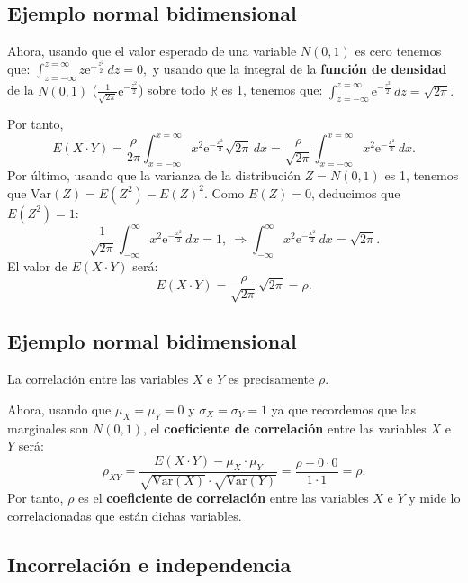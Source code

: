 \documentclass[]{book}
\begin{document}
\hypertarget{ejemplo-normal-bidimensional-1}{%
\subsection{Ejemplo normal bidimensional}\label{ejemplo-normal-bidimensional-1}}

Ahora, usando que el valor esperado de una variable \(N(0,1)\) es cero tenemos que:
\(\int_{z=-\infty}^{z=\infty} z \mathrm{e}^{-\frac{z^2}{2}}\, dz =0,\) y usando que la integral de la \textbf{función de densidad} de la \(N(0,1)\) (\(\frac{1}{\sqrt{2\pi}}\mathrm{e}^{-\frac{z^2}{2}}\)) sobre todo \(\mathbb{R}\) es 1, tenemos que:
\(\int_{z=-\infty}^{z=\infty} \mathrm{e}^{-\frac{z^2}{2}}\, dz =\sqrt{2\pi}.\)

Por tanto,
\[
E(X\cdot Y)=\frac{\rho}{2\pi} \int_{x=-\infty}^{x=\infty} x^2  \mathrm{e}^{-\frac{x^2}{2}}\sqrt{2\pi}\, dx=\frac{\rho}{\sqrt{2\pi}}\int_{x=-\infty}^{x=\infty} x^2  \mathrm{e}^{-\frac{x^2}{2}}\, dx.
\]
Por último, usando que la varianza de la distribución \(Z=N(0,1)\) es 1, tenemos que \(\mathrm{Var}(Z)=E\left(Z^2\right)-E(Z)^2\). Como \(E(Z)=0\), deducimos que \(E\left(Z^2\right)=1\):
\[
\frac{1}{\sqrt{2\pi}}\int_{-\infty}^\infty x^2\mathrm{e}^{-\frac{x^2}{2}}\, dx=1,\ \Rightarrow \int_{-\infty}^\infty x^2\mathrm{e}^{-\frac{x^2}{2}}\, dx=\sqrt{2\pi}.
\]
El valor de \(E(X\cdot Y)\) será:
\[
E(X\cdot Y)=\frac{\rho}{\sqrt{2\pi}}\sqrt{2\pi}=\rho.
\]

\hypertarget{ejemplo-normal-bidimensional-2}{%
\subsection{Ejemplo normal bidimensional}\label{ejemplo-normal-bidimensional-2}}

La correlación entre las variables \(X\) e \(Y\) es precisamente \(\rho\).

Ahora, usando que \(\mu_X=\mu_Y=0\) y \(\sigma_X=\sigma_Y=1\) ya que recordemos que las marginales son \(N(0,1)\), el \textbf{coeficiente de correlación} entre las variables \(X\) e \(Y\) será:
\[
\rho_{XY}=\frac{E(X\cdot Y)-\mu_X\cdot \mu_Y}{\sqrt{\mathrm{Var}(X)}\cdot\sqrt{\mathrm{Var}(Y)}}=\frac{\rho-0\cdot 0}{1\cdot 1}=\rho.
\]
Por tanto, \(\rho\) es el \textbf{coeficiente de correlación} entre las variables \(X\) e \(Y\) y mide lo correlacionadas que están dichas variables.

\hypertarget{incorrelaciuxf3n-e-independencia}{%
\subsection{Incorrelación e independencia}\label{incorrelaciuxf3n-e-independencia}}
\end{document}
